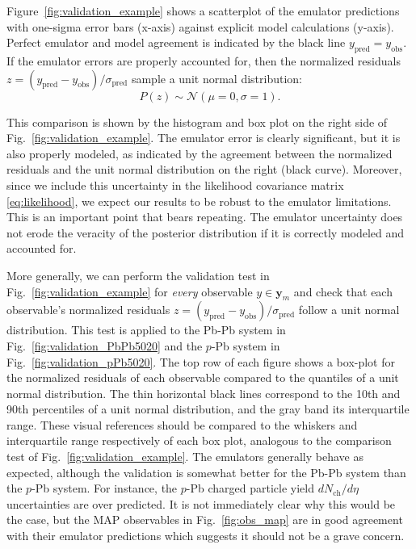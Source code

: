 \documentclass[aps,prc,reprint,amsmath,nofootinbib]{revtex4-1}
\newcommand{\nch}{N_\text{ch}}
\newcommand{\y}{\mathbf{y}}
\begin{document}
Figure~\ref{fig:validation_example} shows a scatterplot of the emulator predictions with one-sigma error bars (x-axis) against explicit model calculations (y-axis).
Perfect emulator and model agreement is indicated by the black line $y_\text{pred} = y_\text{obs}$.
If the emulator errors are properly accounted for, then the normalized residuals ${z=(y_\text{pred} - y_\text{obs})/\sigma_\text{pred}}$ sample a unit normal distribution:
\begin{equation}
  P(z) \sim \mathcal{N}(\mu=0,\sigma=1).
\end{equation}

This comparison is shown by the histogram and box plot on the right side of Fig.~\ref{fig:validation_example}.
The emulator error is clearly significant, but it is also properly modeled, as indicated by the agreement between the normalized residuals and the unit normal distribution on the right (black curve).
Moreover, since we include this uncertainty in the likelihood covariance matrix \eqref{eq:likelihood}, we expect our results to be robust to the emulator limitations.
This is an important point that bears repeating.
The emulator uncertainty does not erode the veracity of the posterior distribution if it is correctly modeled and accounted for.

More generally, we can perform the validation test in Fig.~\ref{fig:validation_example} for \emph{every} observable $y \in \y_m$ and check that each observable's normalized residuals ${z=(y_\text{pred} - y_\text{obs})/\sigma_\text{pred}}$ follow a unit normal distribution.
This test is applied to the Pb-Pb system in Fig.~\ref{fig:validation_PbPb5020} and the $p$-Pb system in Fig.~\ref{fig:validation_pPb5020}.
The top row of each figure shows a box-plot for the normalized residuals of each observable compared to the quantiles of a unit normal distribution.
The thin horizontal black lines correspond to the 10th and 90th percentiles of a unit normal distribution, and the gray band its interquartile range.
These visual references should be compared to the whiskers and interquartile range respectively of each box plot, analogous to the comparison test of Fig.~\ref{fig:validation_example}.
The emulators generally behave as expected, although the validation is somewhat better for the Pb-Pb system than the $p$-Pb system.
For instance, the $p$-Pb charged particle yield $d\nch/d\eta$ uncertainties are over predicted.
It is not immediately clear why this would be the case, but the MAP observables in Fig.~\ref{fig:obs_map} are in good agreement with their emulator predictions which suggests it should not be a grave concern.
\end{document}
